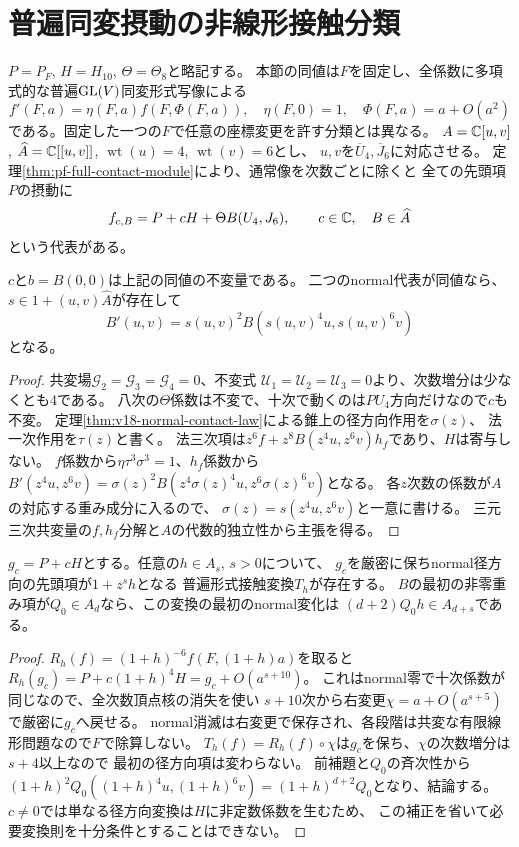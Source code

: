 \section{普遍同変摂動の非線形接触分類}
\label{sec:pf-contact-classification}
$P=P_F$, $H=H_{10}$, $\Theta=\Theta_8$と略記する。
本節の同値は$F$を固定し、全係数に多項式的な普遍$\mathrm{GL}(V)$同変形式写像による
\[
 f'(F,a)=\eta(F,a)f(F,\Phi(F,a)),\quad
 \eta(F,0)=1,\quad\Phi(F,a)=a+O(a^2)
\]
である。固定した一つの$F$で任意の座標変更を許す分類とは異なる。
$A=\mathbb C[u,v]$, $\widehat A=\mathbb C[[u,v]]$, $\operatorname{wt}(u)=4$, $\operatorname{wt}(v)=6$とし、
$u,v$を$\overline U_4,\overline J_6$に対応させる。
定理\ref{thm:pf-full-contact-module}により、通常像を次数ごとに除くと
全ての先頭項$P$の摂動に
\[
 f_{c,B}=P+cH+\Theta B(U_4,J_6),\qquad c\in\mathbb C,\quad B\in\widehat A
\]
という代表がある。

\begin{lemma}[二定数とnormal比の必要変換則]
\label{lem:pf-normal-ratio-law}
$c$と$b=B(0,0)$は上記の同値の不変量である。
二つのnormal代表が同値なら、$s\in1+(u,v)\widehat A$が存在して
\[
 B'(u,v)=s(u,v)^2B(s(u,v)^4u,s(u,v)^6v)
\]
となる。
\end{lemma}
\begin{proof}
共変場$\mathcal G_2=\mathcal G_3=\mathcal G_4=0$、不変式
$\mathcal U_1=\mathcal U_2=\mathcal U_3=0$より、次数増分は少なくとも4である。
八次の$\Theta$係数は不変で、十次で動くのは$PU_4$方向だけなので$c$も不変。
定理\ref{thm:v18-normal-contact-law}による錐上の径方向作用を$\sigma(z)$、
法一次作用を$\tau(z)$と書く。
法三次項は$z^6f+z^8B(z^4u,z^6v)h_f$であり、$H$は寄与しない。
$f$係数から$\eta\tau^3\sigma^3=1$、$h_f$係数から
$B'(z^4u,z^6v)=\sigma(z)^2B(z^4\sigma(z)^4u,z^6\sigma(z)^6v)$となる。
各$z$次数の係数が$A$の対応する重み成分に入るので、
$\sigma(z)=s(z^4u,z^6v)$と一意に書ける。
三元三次共変量の$f,h_f$分解と$A$の代数的独立性から主張を得る。
\end{proof}

\begin{lemma}[十次模型の安定化群]
\label{lem:pf-radial-stabilizer}
$g_c=P+cH$とする。任意の$h\in A_s$, $s>0$について、
$g_c$を厳密に保ちnormal径方向の先頭項が$1+z^sh$となる
普遍形式接触変換$T_h$が存在する。
$B$の最初の非零重み項が$Q_0\in A_d$なら、この変換の最初のnormal変化は
$(d+2)Q_0h\in A_{d+s}$である。
\end{lemma}
\begin{proof}
$R_h(f)=(1+h)^{-6}f(F,(1+h)a)$を取ると
$R_h(g_c)=P+c(1+h)^4H=g_c+O(a^{s+10})$。
これはnormal零で十次係数が同じなので、全次数頂点核の消失を使い
$s+10$次から右変更$\chi=a+O(a^{s+5})$で厳密に$g_c$へ戻せる。
normal消滅は右変更で保存され、各段階は共変な有限線形問題なので$F$で除算しない。
$T_h(f)=R_h(f)\circ\chi$は$g_c$を保ち、$\chi$の次数増分は$s+4$以上なので
最初の径方向項は変わらない。
前補題と$Q_0$の斉次性から
$(1+h)^2Q_0((1+h)^4u,(1+h)^6v)=(1+h)^{d+2}Q_0$となり、結論する。
$c\ne0$では単なる径方向変換は$H$に非定数係数を生むため、
この補正を省いて必要変換則を十分条件とすることはできない。
\end{proof}

